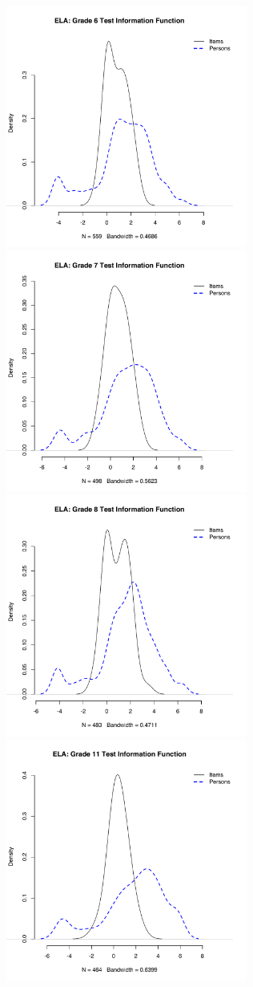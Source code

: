 \documentclass[]{article}
\begin{document}
\includegraphics[height=3.12500in]{ipdens/ela6ipdens.pdf}
\includegraphics[height=3.12500in]{ipdens/ela7ipdens.pdf}
\includegraphics[height=3.12500in]{ipdens/ela8ipdens.pdf}
\includegraphics[height=3.12500in]{ipdens/ela11ipdens.pdf} \clearpage
\end{document}
